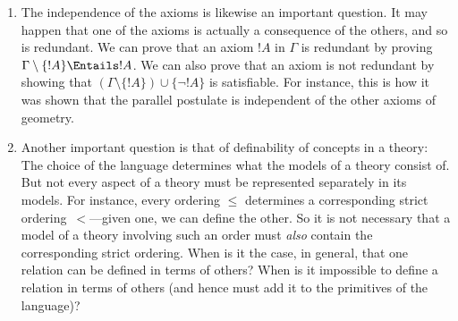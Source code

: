 \documentclass[../../../include/open-logic-section]{subfiles}
\begin{document}
\begin{explain}
\begin{enumerate}
  logical methods to investigate them, and we can also use logical
  methods to construct models.
\item The independence of the axioms is likewise an important
  question.  It may happen that one of the axioms is actually a
  consequence of the others, and so is redundant.  We can prove that
  an axiom $!A$ in $\Gamma$ is redundant by proving $\Gamma \setminus
  \{!A\} \Entails !A$.  We can also prove that an axiom is not
  redundant by showing that $(\Gamma \setminus \{!A\}) \cup \{\lnot
  !A\}$ is satisfiable.  For instance, this is how it was shown that the
  parallel postulate is independent of the other axioms of geometry.
\item Another important question is that of definability of concepts
  in a theory: The choice of the language determines what the models
  of a theory consist of.  But not every aspect of a theory must be
  represented separately in its models.  For instance, every ordering
  $\le$ determines a corresponding strict ordering~$<$---given one, we
  can define the other.  So it is not necessary that a model of a
  theory involving such an order must \emph{also} contain the
  corresponding strict ordering.  When is it the case, in general,
  that one relation can be defined in terms of others?  When is it
  impossible to define a relation in terms of others (and hence must
  add it to the primitives of the language)?
\end{enumerate}
\end{explain}
\end{document}
